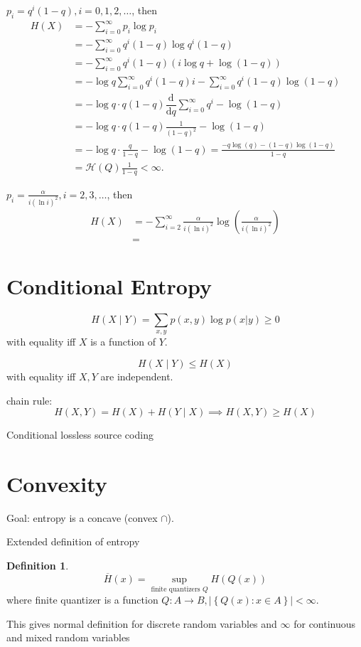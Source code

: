 \documentclass{report}
\newcommand{\df}{\mathrm{d}}
\newcommand{\dr}[2]{\dfrac{\df #1}{\df #2}}
\newcommand{\set}[1]{\left\lbrace #1 \right\rbrace}
\theoremstyle{definition}
\newtheorem{definition}{Definition}[section]
\theoremstyle{remark}
\numberwithin{equation}{section}
\begin{document}
$p_i = q^i(1 - q), i = 0, 1, 2, \ldots$, then \begin{align*}
  H(X) & = -\sum_{i=0}^\infty p_i \log p_i \\
  & = -\sum_{i=0}^\infty q^i(1-q)\log q^i(1-q) \\
  & = -\sum_{i=0}^\infty q^i(1-q)\left(i\log q + \log(1-q)\right) \\
  & = -\log q\sum_{i=0}^\infty q^i(1-q)i - \sum_{i=0}^\infty q^i(1-q)\log(1-q) \\
  & = -\log q \cdot q(1 - q) \dr{}{q} \sum_{i=0}^\infty q^i - \log(1-q) \\
  & = - \log q \cdot q(1 - q) \frac{1}{(1-q)^2} - \log(1-q) \\
  & =  - \log q \cdot \frac{q}{1-q} - \log(1-q) = \frac{-q\log(q) - (1 - q)\log(1-q)}{1- q} \\
  & = \mathscr{H}(Q)\frac{1}{1 - q} < \infty.
\end{align*}

$p_i = \frac{\alpha}{i(\ln i)^2}, i = 2, 3, \ldots$, then \begin{align*}
  H(X) & = -\sum_{i=2}^\infty \frac{\alpha}{i(\ln i)^2} \log \left(\frac{\alpha}{i(\ln i)^2}\right) \\
  & = 
\end{align*}

\section{Conditional Entropy}

\[H(X \mid Y) = \sum_{x, y} p(x, y) \log p(x|y) \geq 0\] with equality iff $X$ is a function of $Y$.

\[H(X \mid Y) \leq H(X)\] with equality iff $X, Y$ are independent. 

chain rule: \[
  H(X, Y) = H(X) + H(Y \mid X) \implies H(X, Y) \geq H(X) 
\]

Conditional lossless source coding

\section{Convexity}
Goal: entropy is a concave (convex $\cap$).

Extended definition of entropy 
\begin{definition}
  \[\overline{H}(x) = \sup_{\text{finite quantizers $Q$}} H(Q(x)) \] where finite quantizer is a function $Q: A \to B, |\set{Q(x): x \in A}| < \infty$.
\end{definition}
This gives normal definition for discrete random variables and $\infty$ for continuous and mixed random variables
\end{document}
